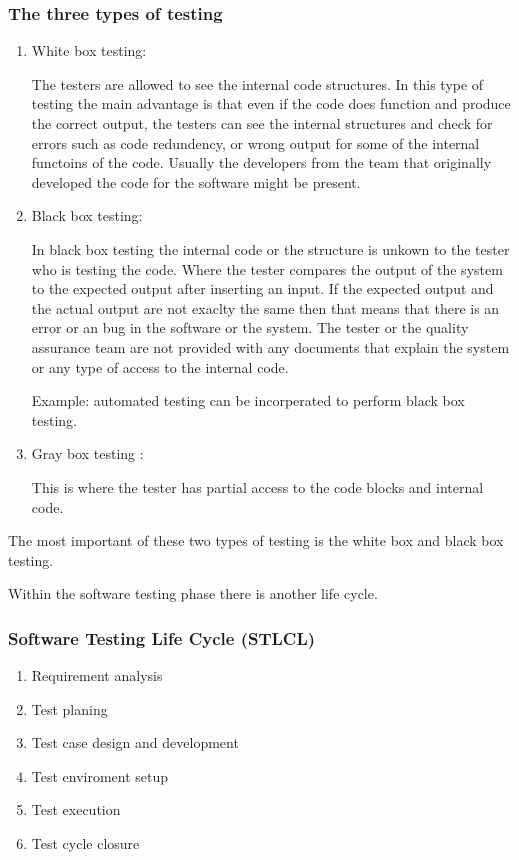 \documentclass[a4paper]{article}
\begin{document}
\subsubsection{The three types of testing }
\begin{enumerate}
    \item White box testing:


        The testers are allowed to see the internal code structures. In this type of testing the main advantage is that even if the code does function
        and produce the correct output, the testers can see the internal structures and check for errors such as code redundency, or wrong output for
        some of the internal functoins of the code. Usually the developers from the team that originally developed the code for the software might be 
        present.

    \item Black box testing:

        In black box testing the internal code or the structure is unkown to the tester who is testing the code. Where the tester compares the output 
        of the system to the expected output after inserting an input. If the expected output and the actual output are not exaclty the same then that 
        means that there is an error or an bug in the software or the system. The tester or the quality assurance team are not provided with any documents that 
        explain the system or any type of access to the internal code.

Example: automated testing can be incorperated to perform black box testing.

    \item Gray box testing : 

        This is where the tester has partial access to the code blocks and internal code. 

\end{enumerate}

The most important of these two types of testing is the white box and black box testing.

Within the software testing phase there is another life cycle.

\subsubsection{Software Testing Life Cycle (STLCL)}

\begin{enumerate}
    \item Requirement analysis
    \item Test planing 
    \item Test case design and development 
    \item Test enviroment setup
    \item Test execution
    \item Test cycle closure
\end{enumerate}
\end{document}
